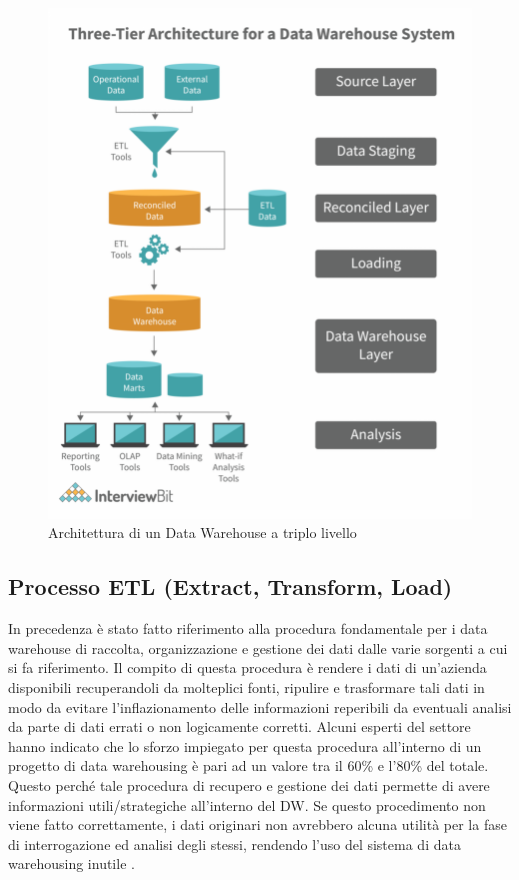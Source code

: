 \begin{itemize}
\begin{figure}[H]
    \includegraphics[height=0.65\linewidth]{figure/capitolo_2/DW - Triple Tier Architetcure.pdf}
    \caption{Architettura di un Data Warehouse a triplo livello} 
    \label{fig:DW - Triple Tier Architetcure}
    \end{figure}
\end{itemize}

\subsection{Processo ETL (Extract, Transform, Load)}

In precedenza è stato fatto riferimento alla procedura fondamentale per i data warehouse di raccolta, organizzazione e gestione dei dati dalle varie sorgenti a cui si fa riferimento. Il compito di questa procedura è rendere i dati di un'azienda disponibili recuperandoli da molteplici fonti, ripulire e trasformare tali dati in modo da evitare l'inflazionamento delle informazioni reperibili da eventuali analisi da parte di dati errati o non logicamente corretti. Alcuni esperti del settore hanno indicato che lo sforzo impiegato per questa procedura all'interno di un progetto di data warehousing è pari ad un valore tra il 60\% e l'80\% del totale. Questo perché tale procedura di recupero e gestione dei dati permette di avere informazioni utili/strategiche all'interno del DW. Se questo procedimento non viene fatto correttamente, i dati originari non avrebbero alcuna utilità per la fase di interrogazione ed analisi degli stessi, rendendo l'uso del sistema di data warehousing inutile \cite{researchgate_etl_process}.

